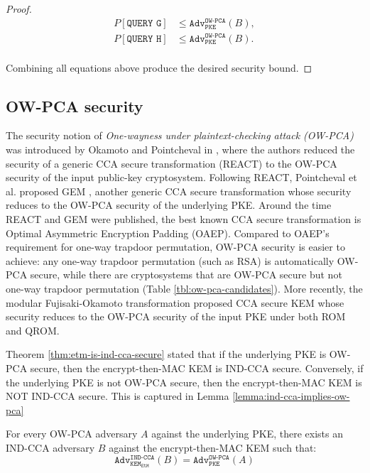 \documentclass[runningheads]{llncs}
\newcommand{\pke}{\texttt{PKE}}
\newcommand{\kem}{\texttt{KEM}}
\newcommand{\etm}{\texttt{EtM}}  %
\newcommand{\adv}{\texttt{Adv}}
\begin{document}
\begin{proof}
    \begin{equation*}
        \begin{aligned}
            P\left[\texttt{QUERY G}\right] &\leq \adv^\texttt{OW-PCA}_\pke(B), \\
            P\left[\texttt{QUERY H}\right] &\leq \adv^\texttt{OW-PCA}_\pke(B). \\
        \end{aligned}
    \end{equation*}

    Combining all equations above produce the desired security bound.
\end{proof}

\subsection{OW-PCA security}\label{sec:ow-pca-security}
The security notion of \textit{One-wayness under plaintext-checking attack (OW-PCA)} was introduced by Okamoto and Pointcheval in \cite{DBLP:conf/ctrsa/OkamotoP01}, where the authors reduced the security of a generic CCA secure transformation (REACT) to the OW-PCA security of the input public-key cryptosystem. Following REACT, Pointcheval et al. proposed GEM \cite{DBLP:conf/ctrsa/CoronHJPPT02}, another generic CCA secure transformation whose security reduces to the OW-PCA security of the underlying PKE. Around the time REACT and GEM were published, the best known CCA secure transformation is Optimal Asymmetric Encryption Padding (OAEP)\cite{DBLP:conf/eurocrypt/BellareR94}. Compared to OAEP's requirement for one-way trapdoor permutation, OW-PCA security is easier to achieve: any one-way trapdoor permutation (such as RSA) is automatically OW-PCA secure, while there are cryptosystems that are OW-PCA secure but not one-way trapdoor permutation (Table \ref{tbl:ow-pca-candidates}). More recently, the modular Fujisaki-Okamoto transformation \cite{DBLP:conf/tcc/HofheinzHK17} proposed CCA secure KEM whose security reduces to the OW-PCA security of the input PKE under both ROM and QROM.

Theorem \ref{thm:etm-is-ind-cca-secure} stated that if the underlying PKE is OW-PCA secure, then the encrypt-then-MAC KEM is IND-CCA secure. Conversely, if the underlying PKE is not OW-PCA secure, then the encrypt-then-MAC KEM is NOT IND-CCA secure. This is captured in Lemma \ref{lemma:ind-cca-implies-ow-pca}

\begin{lemma}\label{lemma:ind-cca-implies-ow-pca}
    For every OW-PCA adversary $A$ against the underlying PKE, there exists an IND-CCA adversary $B$ against the encrypt-then-MAC KEM such that:
    \begin{equation*}
        \adv^\texttt{IND-CCA}_{\kem_\etm}(B) = \adv^\texttt{OW-PCA}_{\pke}(A)
    \end{equation*}
\end{lemma}
\end{document}
